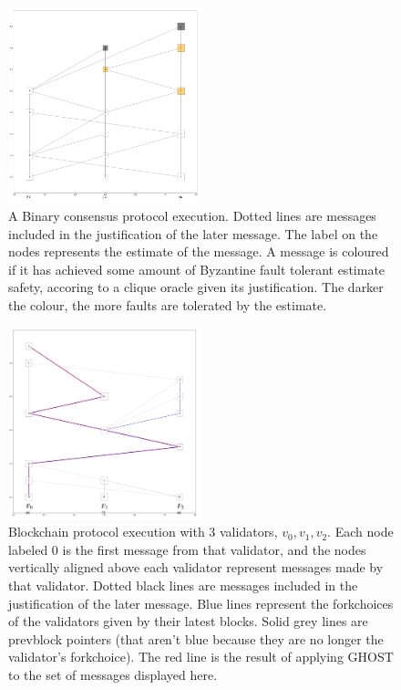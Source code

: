 \documentclass{article}
\theoremstyle{definition}
\begin{document}
\begin{figure}[h!]
\centering
\includegraphics[width=0.5\textwidth]{3binary}
\caption{A Binary consensus protocol execution. Dotted lines are messages included in the justification of the later message. The label on the nodes represents the estimate of the message. A message is coloured if it has achieved some amount of Byzantine fault tolerant estimate safety, accoring to a clique oracle given its justification. The darker the colour, the more faults are tolerated by the estimate.}
\end{figure}


\begin{figure}[h!]
\centering
\includegraphics[width=0.5\textwidth]{3nodeblockchain-fix}
\caption{Blockchain protocol execution with 3 validators, $v_0, v_1, v_2$. Each node labeled $0$ is the first message from that validator, and the nodes vertically aligned above each validator represent messages made by that validator. Dotted black lines are messages included in the justification of the later message. Blue lines represent the forkchoices of the validators given by their latest blocks. Solid grey lines are prevblock pointers (that aren't blue because they are no longer the validator's forkchoice). The red line is the result of applying GHOST to the set of messages displayed here.}
\end{figure}
\end{document}
